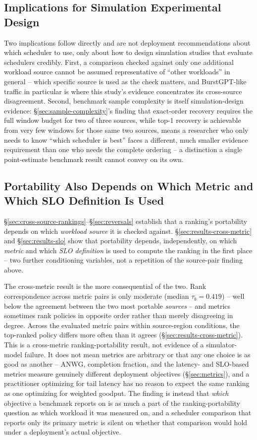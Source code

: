 \subsection{Implications for Simulation Experimental Design}

Two implications follow directly and are not deployment recommendations
about which scheduler to use, only about how to design simulation studies
that evaluate schedulers credibly. First, a comparison checked against only
one additional workload
source cannot be assumed representative of ``other workloads'' in
general -- which specific source is used as the check matters, and
BurstGPT-like traffic in particular is where this study's evidence
concentrates its cross-source disagreement. Second, benchmark sample
complexity is itself simulation-design evidence:
\S\ref{sec:sample-complexity}'s finding that exact-order recovery requires
the full window budget for two of three sources, while top-1 recovery is
achievable from very few windows for those same two sources, means a
researcher who only needs to know ``which scheduler is best'' faces a
different, much smaller evidence requirement than one who needs the
complete ordering -- a distinction a single point-estimate benchmark
result cannot convey on its own.

\subsection{Portability Also Depends on Which Metric and Which SLO
Definition Is Used}

\S\ref{sec:cross-source-rankings}--\S\ref{sec:reversals} establish that a
ranking's portability depends on which \emph{workload source} it is checked
against. \S\ref{sec:results-cross-metric} and \S\ref{sec:results-slo} show
that portability depends, independently, on which \emph{metric} and which
\emph{SLO definition} is used to compute the ranking in the first place --
two further conditioning variables, not a repetition of the source-pair
finding above.

The cross-metric result is the more consequential of the two. Rank
correspondence across metric pairs is only moderate (median
$\tau_b = 0.419$) -- well below the agreement between the two most portable
\emph{sources} -- and metrics sometimes rank policies in opposite order
rather than merely disagreeing in degree. Across the evaluated metric pairs
within source-region conditions, the top-ranked policy differs more often
than it agrees (\S\ref{sec:results-cross-metric}). This is a
cross-metric ranking-portability result, not evidence of a simulator-model
failure. It does not mean
metrics are arbitrary or that any one choice is as good as another -- ANWG,
completion fraction, and the latency- and SLO-based metrics measure
genuinely different deployment objectives (\S\ref{sec:metrics}), and a
practitioner optimizing for tail latency has no reason to expect the same
ranking as one optimizing for weighted goodput. The finding is instead that
\emph{which} objective a benchmark reports on is as much a part of the
ranking-portability question as which workload it was measured on, and a
scheduler comparison that reports only its primary metric is silent on
whether that comparison would hold under a deployment's actual objective.

